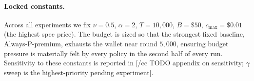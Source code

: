 \paragraph{Locked constants.}
Across all experiments we fix $\nu = 0.5$, $\alpha = 2$, $T = 10{,}000$, $B = \$50$, $c_{\max} = \$0.01$ (the highest spec price). The budget is sized so that the strongest fixed baseline, Always-P-premium, exhausts the wallet near round $5{,}000$, ensuring budget pressure is materially felt by every policy in the second half of every run. Sensitivity to these constants is reported in [/cc TODO appendix on sensitivity; $\gamma$ sweep is the highest-priority pending experiment].
